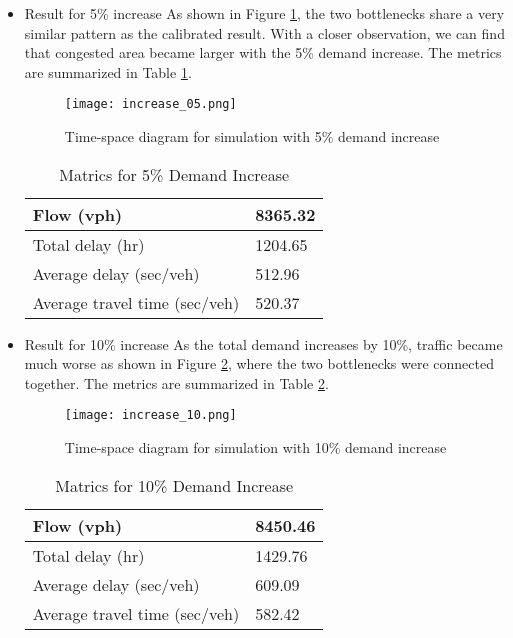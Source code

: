 \documentclass{article}
\begin{document}
\begin{itemize}
\item {Result for 5\% increase}
\newline
As shown in Figure \ref{fig:increase_05}, the two bottlenecks share a very similar pattern as the calibrated result. With a closer observation, we can find that congested area became larger with the 5\% demand increase. The metrics are summarized in Table \ref{5per}.
\begin{figure}
    \centering
    \texttt{[image: increase\_05.png]}
    \caption{Time-space diagram for simulation with 5\% demand increase}
    \label{fig:increase_05}
\end{figure}

\begin{table}[]
\centering
\caption{Matrics for 5\% Demand Increase}
\begin{tabular}{|l|l|}
\hline
Flow (vph)                    & 8365.32 \\ \hline
Total delay (hr)              & 1204.65 \\ \hline
Average delay (sec/veh)       & 512.96  \\ \hline
Average travel time (sec/veh) & 520.37  \\ \hline
\end{tabular}
\label{5per}
\end{table}


\item {Result for 10\% increase}
\newline
As the total demand increases by 10\%, traffic became much worse as shown in Figure \ref{fig:increase_10}, where the two bottlenecks were connected together. The metrics are summarized in Table \ref{10per}.
\begin{figure}
    \centering
    \texttt{[image: increase\_10.png]}
    \caption{Time-space diagram for simulation with 10\% demand increase}
    \label{fig:increase_10}
\end{figure}

\begin{table}[]
\centering
\caption{Matrics for 10\% Demand Increase}
\begin{tabular}{|l|l|}
\hline
Flow (vph)                    & 8450.46 \\ \hline
Total delay (hr)              & 1429.76 \\ \hline
Average delay (sec/veh)       & 609.09  \\ \hline
Average travel time (sec/veh) & 582.42  \\ \hline
\end{tabular}
\label{10per}
\end{table}



\end{itemize}
\end{document}
